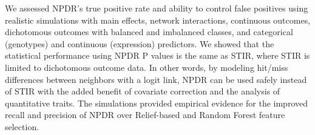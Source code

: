 \documentclass{bioinfo}
\begin{document}
We assessed NPDR's true positive rate and ability to control false positives using realistic simulations with main effects, network interactions, continuous outcomes, dichotomous outcomes with balanced and imbalanced classes, and categorical (genotypes) and continuous (expression) predictors.
We showed that the statistical performance using NPDR P values is the same as STIR, where STIR is limited to dichotomous outcome data.
In other words, by modeling hit/miss differences between neighbors with a logit link, NPDR can be used safely instead of STIR with the added benefit of covariate correction and the analysis of quantitative traits.
The simulations provided empirical evidence for the improved recall and precision of NPDR over Relief-based and Random Forest feature selection.

\end{document}
